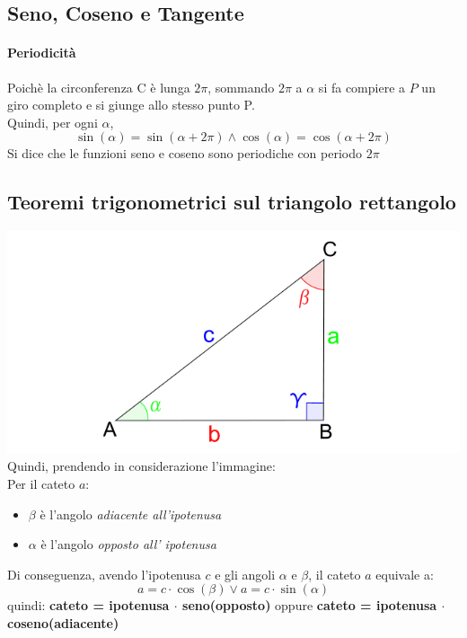 \documentclass[12pt, a4paper, openany]{book}
\begin{document}
\subsection*{Seno, Coseno e Tangente}
\paragraph*{Periodicità}
Poichè la circonferenza C è lunga $2\pi$, sommando $2\pi$ a $\alpha$ si fa compiere a $P$
un giro completo e si giunge allo stesso punto P. 
\\Quindi, per ogni $\alpha$,
\[\sin(\alpha) = \sin(\alpha + 2\pi) \wedge \cos(\alpha) = \cos(\alpha+2\pi)\]
Si dice che le funzioni seno e coseno sono periodiche con periodo $2\pi$


\subsection*{Teoremi trigonometrici sul triangolo rettangolo}

\includegraphics[width=\textwidth]{triangoloRettangolo.png}
Quindi, prendendo in considerazione l'immagine:
\\Per il cateto $a$:
\begin{itemize} %
    \item  $\beta$ è l'angolo \emph{adiacente all'ipotenusa}
    \item  $\alpha$ è l'angolo \emph{opposto all' ipotenusa}
\end{itemize}
Di conseguenza, avendo l'ipotenusa $c$ e gli angoli $\alpha$ e $\beta$, il cateto $a$ equivale a:
\[ a = c\cdot \cos(\beta) \vee a = c\cdot \sin(\alpha) \]
quindi: \textbf{cateto = ipotenusa $\cdot$ seno(opposto)} oppure \textbf{cateto = ipotenusa $\cdot$ coseno(adiacente)}
\end{document}
